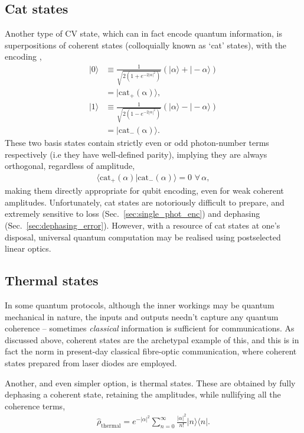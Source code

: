 \documentclass[aps,rmp,twocolumn,amsmath,amssymb,nofootinbib,superscriptaddress]{revtex4}
\newcommand{\bra}[1]{\langle#1|}
\newcommand{\ket}[1]{|#1\rangle}
\begin{document}
%
%

\subsection{Cat states} \label{sec:cat_enc}

Another type of CV state, which can in fact encode quantum information, is superpositions of coherent states (colloquially known as `cat' states), with the encoding \cite{???},
\begin{align}
\ket{0} &\equiv \frac{1}{\sqrt{2(1+e^{-2|\alpha|^2})}} (\ket{\alpha}+\ket{-\alpha}) \nonumber \\
&= \ket{\mathrm{cat_+(\alpha)}},\nonumber \\
\ket{1} &\equiv \frac{1}{\sqrt{2(1-e^{-2|\alpha|^2})}}(\ket{\alpha}-\ket{-\alpha}) \nonumber \\
&= \ket{\mathrm{cat_-(\alpha)}}.
\end{align}
These two basis states contain strictly even or odd photon-number terms respectively (i.e they have well-defined parity), implying they are always orthogonal, regardless of amplitude,
\begin{align}
\langle\mathrm{cat}_+(\alpha)|\mathrm{cat}_-(\alpha)\rangle = 0 \,\,\forall\,\alpha,
\end{align}
making them directly appropriate for qubit encoding, even for weak coherent amplitudes. Unfortunately, cat states are notoriously difficult to prepare, and extremely sensitive to loss (Sec.~\ref{sec:single_phot_enc}) and dephasing (Sec.~\ref{sec:dephasing_error}). However, with a resource of cat states at one's disposal, universal quantum computation may be realised using postselected linear optics.

%
%

\subsection{Thermal states}

In some quantum protocols, although the inner workings may be quantum mechanical in nature, the inputs and outputs needn't capture any quantum coherence -- sometimes \emph{classical} information is sufficient for communications. As discussed above, coherent states are the archetypal example of this, and this is in fact the norm in present-day classical fibre-optic communication, where coherent states prepared from laser diodes are employed.

Another, and even simpler option, is thermal states. These are obtained by fully dephasing a coherent state, retaining the amplitudes, while nullifying all the coherence terms,
\begin{align}
\hat\rho_\mathrm{thermal} = e^{-|\alpha|^2} \sum_{n=0}^\infty \frac{|\alpha|^2}{n!}\ket{n}\bra{n}.
\end{align}
\end{document}
